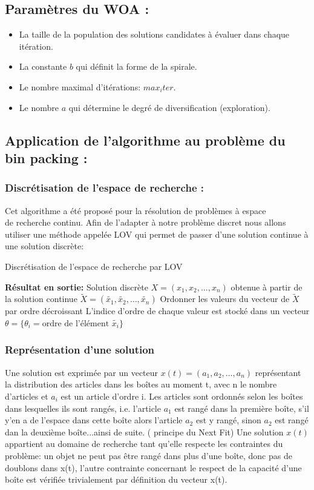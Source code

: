 \documentclass[12pt]{article}
\begin{document}
\subsection{Paramètres du WOA :}
\begin{itemize}
    \item La taille de la population des solutions candidates à évaluer dans chaque itération.
    \item La constante \(b\) qui définit la forme de la spirale.
    \item Le nombre maximal d’itérations: \(max_iter\).
    \item Le nombre \(a\) qui détermine le degré de diversification (exploration).    
\end{itemize}
\subsection{Application de l’algorithme au problème du bin packing :}
\subsubsection{Discrétisation de l'espace de recherche :}
Cet algorithme a été proposé pour la résolution de problèmes à espace \\ de recherche continu. Afin de l’adapter à notre problème discret nous allons utiliser une méthode appelée LOV qui permet de passer d’une solution continue à une solution discrète:\\
\begin{algorithm}[H]
    \caption{Discrétisation de l'espace de recherche par LOV}
    \begin{algorithmic}
        \STATE \textbf{Résultat en sortie:} Solution discrète \(X = (x_1, x_2, \dots, x_n)\) obtenue à partir de la solution continue \(\tilde{X} = (\tilde{x_1}, \tilde{x_2}, \dots, \tilde{x_n})\)\;
        \STATE Ordonner les valeurs du vecteur de \(\tilde{X}\) par ordre décroissant\;
        \STATE L'indice d'ordre de chaque valeur est stocké dans un vecteur \(\theta = \{ \theta_i = \text{ordre de l'élément } \tilde{x_i}\}\)\;
    \end{algorithmic}  
\end{algorithm}
\subsubsection{Représentation d’une solution }
Une solution est exprimée par un vecteur $ x(t)=(a_1, a_2, …, a_n)$ représentant la distribution des articles dans les boîtes au moment t, avec n le nombre d’articles et $a_i$ est un article d’ordre i. Les articles sont ordonnés selon les boîtes dans lesquelles ils sont rangés, i.e. l’article $a_1$ est rangé dans la première boîte, s’il y’en a de l’espace dans cette boîte alors l’article $a_2$ est y rangé, sinon $a_2$ est rangé dan la deuxième boîte...ainsi de suite. ( principe du Next Fit) 
Une solution \(x(t)\) appartient au domaine de recherche tant qu’elle respecte les contraintes du problème: un objet ne peut pas être rangé dans plus d’une boîte, donc pas de doublons dans x(t), l’autre contrainte concernant le respect de la capacité d’une boîte est vérifiée trivialement par définition du vecteur x(t).
\end{document}
